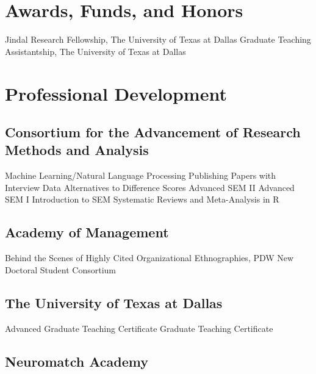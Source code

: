 \section*{Awards, Funds, and Honors}

\begin{entries}
    Jindal Research Fellowship, The University of Texas at Dallas
    Graduate Teaching Assistantship, The University of Texas at Dallas
\end{entries}


\ifcvextended
\section*{Professional Development}

\subsection*{Consortium for the Advancement of Research Methods and Analysis}

\begin{entries}
    Machine Learning/Natural Language Processing
    Publishing Papers with Interview Data
    Alternatives to Difference Scores
    Advanced SEM II
    Advanced SEM I
    Introduction to SEM
    Systematic Reviews and Meta-Analysis in R
\end{entries}

\subsection*{Academy of Management}

\begin{entries}
    Behind the Scenes of Highly Cited Organizational Ethnographies, PDW
    New Doctoral Student Consortium
\end{entries}

\subsection*{The University of Texas at Dallas}

\begin{entries}
    Advanced Graduate Teaching Certificate
    Graduate Teaching Certificate
\end{entries}

\subsection*{Neuromatch Academy}


